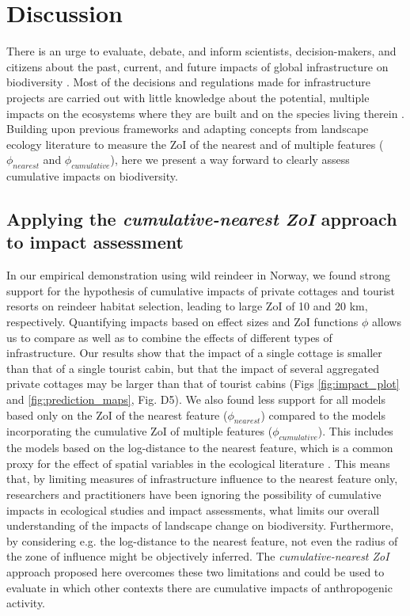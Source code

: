 \documentclass[titlepage]{article}
\begin{document}
\section{Discussion}

There is an urge to evaluate, debate, and inform scientists, decision-makers, and citizens about the past, current, and future impacts of global infrastructure on biodiversity \citep{laurance_conservation_2018}. Most of the decisions and regulations made for infrastructure projects are carried out with little knowledge about the potential, multiple impacts on the ecosystems where they are built and on the species living therein \citep{johnson_regulating_2011,laurance_roads_2017}. Building upon previous frameworks \citep{naugle_unifying_2011} and adapting concepts from landscape ecology literature to measure the ZoI of the nearest and of multiple features ($\phi_{nearest}$ and $\phi_{cumulative}$), here we present a way forward to clearly assess cumulative impacts on biodiversity. 

\subsection{Applying the \textit{cumulative-nearest ZoI} approach to impact assessment}

In our empirical demonstration using wild reindeer in Norway, we found strong support for the hypothesis of cumulative impacts of private cottages and tourist resorts on reindeer habitat selection, leading to large ZoI of 10 and 20 km, respectively. Quantifying impacts based on effect sizes and ZoI functions $\phi$ allows us to compare as well as to combine the effects of different types of infrastructure. Our results show that the impact of a single cottage is smaller than that of a single tourist cabin, but that the impact of several aggregated private cottages may be larger than that of tourist cabins (Figs \ref{fig:impact_plot} and \ref{fig:prediction_maps}, Fig. D5). We also found less support for all models based only on the ZoI of the nearest feature ($\phi_{nearest}$) compared to the models incorporating the cumulative ZoI of multiple features ($\phi_{cumulative}$). This includes the models based on the log-distance to the nearest feature, which is a common proxy for the effect of spatial variables in the ecological literature \citep[e.g.][]{polfus_identifying_2011,torres_assessing_2016}. This means that, by limiting measures of infrastructure influence to the nearest feature only, researchers and practitioners have been ignoring the possibility of cumulative impacts in ecological studies and impact assessments, what limits our overall understanding of the impacts of landscape change on biodiversity. Furthermore, by considering e.g. the log-distance to the nearest feature, not even the radius of the zone of influence might be objectively inferred. The \textit{cumulative-nearest ZoI} approach proposed here overcomes these two limitations and could be used to evaluate in which other contexts there are cumulative impacts of anthropogenic activity.
\end{document}
